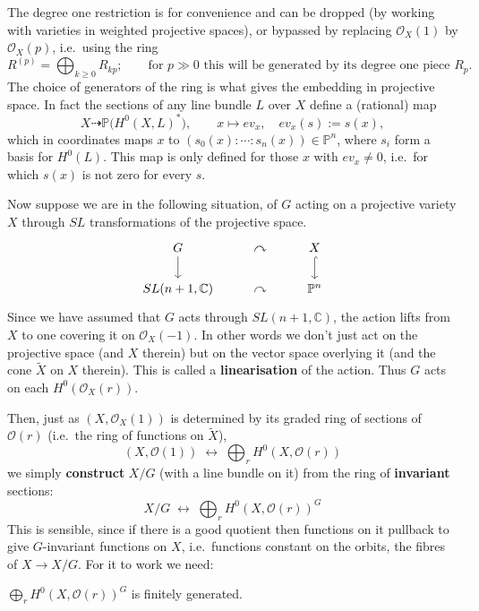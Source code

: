\documentclass[12pt]{article}
\begin{document}
The degree one restriction is for convenience and can be dropped (by working with varieties
in weighted projective spaces), or bypassed by replacing $\mathcal{O}_X(1)$ by $\mathcal{O}_X(p)$,
i.e.~using the ring
\[
  R^{(p)} = \bigoplus_{k \ge 0} R_{kp}; \qquad \text{for $p \gg 0$ this will be generated by its degree one piece $R_p$.}
\]
The choice of generators of the ring is what gives the embedding in projective space. In fact
the sections of any line bundle $L$ over $X$ define a (rational) map
\begin{equation} \label{eq:map}
  X \dashrightarrow \mathbb{P}\big(H^0(X,L)^*\big),
  \qquad
  x \mapsto ev_x,
  \quad
  ev_x(s) := s(x),
\end{equation}
which in coordinates maps $x$ to $(s_0(x):\cdots:s_n(x)) \in \mathbb{P}^n$, where $s_i$ form a basis for $H^0(L)$. This map is only defined for those $x$ with $ev_x \neq 0$,
i.e.~for which $s(x)$ is not zero for every $s$.

Now suppose we are in the following situation, of $G$ acting on a projective variety
$X$ through $SL$ transformations of the projective space.
\[
  \begin{tikzcd}
    G \arrow[d] & \curvearrowright & X \arrow[d,hook] \\
    SL(n+1,\mathbb{C}) & \curvearrowright & \mathbb{P}^n
  \end{tikzcd}
\]
Since we have assumed that $G$ acts through $SL(n+1,\mathbb{C})$, the action lifts from $X$ to one covering it on $\mathcal{O}_X(-1)$. In other words we don't just act on the projective space (and $X$ therein)
but on the vector space overlying it (and the cone $\widetilde{X}$ on $X$ therein). This
is called a \textbf{linearisation} of the action. Thus $G$ acts on each
$H^0(\mathcal{O}_X(r))$.

Then, just as $(X,\mathcal{O}_X(1))$ is determined by its graded ring of sections of
$\mathcal{O}(r)$ (i.e.~the ring of functions on $\widetilde{X}$),
\[
  (X,\mathcal{O}(1)) \;\longleftrightarrow\; \bigoplus_r H^0(X,\mathcal{O}(r))
\]
we simply \textbf{construct} $X/G$ (with a line bundle on it) from the ring of
\textbf{invariant} sections:
\[
  X/G \;\longleftrightarrow\; \bigoplus_r H^0(X,\mathcal{O}(r))^G
\]
This is sensible, since if there is a good quotient then functions on it pullback to give
$G$-invariant functions on $X$, i.e.~functions constant on the orbits, the fibres of
$X \to X/G$. For it to work we need:
\begin{lemma}
  $\bigoplus_r H^0(X,\mathcal{O}(r))^G$ is finitely generated.
\end{lemma}
\end{document}
